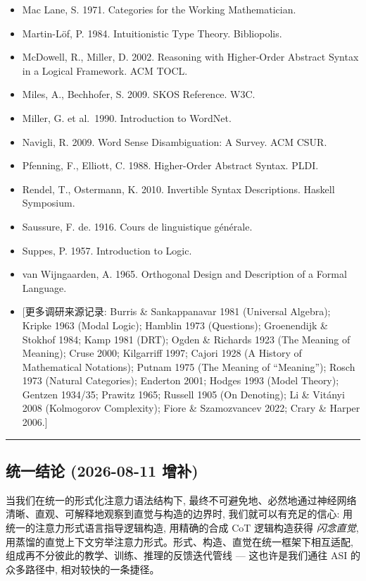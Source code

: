 \documentclass[
]{article}
\begin{document}
\begin{itemize}
  Lambek, J. 1968. A Fixpoint Theorem for Complete Categories. Math. Z.
\item
  Mac Lane, S. 1971. Categories for the Working Mathematician.
\item
  Martin-Löf, P. 1984. Intuitionistic Type Theory. Bibliopolis.
\item
  McDowell, R., Miller, D. 2002. Reasoning with Higher-Order Abstract
  Syntax in a Logical Framework. ACM TOCL.
\item
  Miles, A., Bechhofer, S. 2009. SKOS Reference. W3C.
\item
  Miller, G. et al.~1990. Introduction to WordNet.
\item
  Navigli, R. 2009. Word Sense Disambiguation: A Survey. ACM CSUR.
\item
  Pfenning, F., Elliott, C. 1988. Higher-Order Abstract Syntax. PLDI.
\item
  Rendel, T., Ostermann, K. 2010. Invertible Syntax Descriptions.
  Haskell Symposium.
\item
  Saussure, F. de. 1916. Cours de linguistique générale.
\item
  Suppes, P. 1957. Introduction to Logic.
\item
  van Wijngaarden, A. 1965. Orthogonal Design and Description of a
  Formal Language.
\item
  {[}更多调研来源记录: Burris \& Sankappanavar 1981 (Universal Algebra);
  Kripke 1963 (Modal Logic); Hamblin 1973 (Questions); Groenendijk \&
  Stokhof 1984; Kamp 1981 (DRT); Ogden \& Richards 1923 (The Meaning of
  Meaning); Cruse 2000; Kilgarriff 1997; Cajori 1928 (A History of
  Mathematical Notations); Putnam 1975 (The Meaning of ``Meaning'');
  Rosch 1973 (Natural Categories); Enderton 2001; Hodges 1993 (Model
  Theory); Gentzen 1934/35; Prawitz 1965; Russell 1905 (On Denoting); Li
  \& Vitányi 2008 (Kolmogorov Complexity); Fiore \& Szamozvancev 2022;
  Crary \& Harper 2006.{]}
\end{itemize}

\begin{center}\rule{0.5\linewidth}{0.5pt}\end{center}

\subsection{统一结论 (2026-08-11
增补)}\label{ux7edfux4e00ux7ed3ux8bba-2026-08-11-ux589eux8865}

当我们在统一的形式化注意力语法结构下,
最终不可避免地、必然地通过神经网络清晰、直观、可解释地观察到直觉与构造的边界时,
我们就可以有充足的信心: 用统一的注意力形式语言指导逻辑构造, 用精确的合成
CoT 逻辑构造获得 \emph{闪念直觉},
用蒸馏的直觉上下文穷举注意力形式。形式、构造、直觉在统一框架下相互适配,
组成再不分彼此的教学、训练、推理的反馈迭代管线 --- 这也许是我们通往 ASI
的众多路径中, 相对较快的一条捷径。
\end{document}
